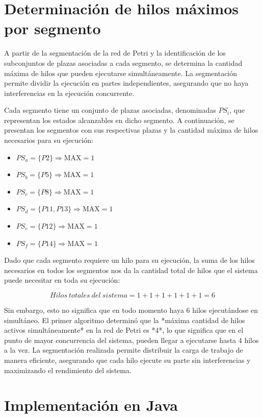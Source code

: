 \documentclass[12pt]{article}
\begin{document}
\section{Determinación de hilos máximos por segmento}

A partir de la segmentación de la red de Petri y la identificación de los subconjuntos de plazas asociadas a cada segmento, se determina la cantidad máxima de hilos que pueden ejecutarse simultáneamente. La segmentación permite dividir la ejecución en partes independientes, asegurando que no haya interferencias en la ejecución concurrente.

Cada segmento tiene un conjunto de plazas asociadas, denominadas \(PS_i\), que representan los estados alcanzables en dicho segmento. A continuación, se presentan los segmentos con sus respectivas plazas y la cantidad máxima de hilos necesarios para su ejecución:

\begin{itemize}
    \item \(PS_a = \{P2\} \Rightarrow \text{MAX} = 1\)
    \item \(PS_b = \{P5\} \Rightarrow \text{MAX} = 1\)
    \item \(PS_c = \{P8\} \Rightarrow \text{MAX} = 1\)
    \item \(PS_d = \{P11, P13\} \Rightarrow \text{MAX} = 1\)
    \item \(PS_e = \{P12\} \Rightarrow \text{MAX} = 1\)
    \item \(PS_f = \{P14\} \Rightarrow \text{MAX} = 1\)
\end{itemize}

Dado que cada segmento requiere un hilo para su ejecución, la suma de los hilos necesarios en todos los segmentos nos da la cantidad total de hilos que el sistema puede necesitar en toda su ejecución:

\[
Hilos\ totales\ del\ sistema = 1 + 1 + 1 + 1 + 1 + 1 = 6
\]

Sin embargo, esto no significa que en todo momento haya 6 hilos ejecutándose en simultáneo.  
El primer algoritmo determinó que la *máxima cantidad de hilos activos simultáneamente* en la red de Petri es *4*, lo que significa que en el punto de mayor concurrencia del sistema, pueden llegar a ejecutarse hasta 4 hilos a la vez.  
La segmentación realizada permite distribuir la carga de trabajo de manera eficiente, asegurando que cada hilo ejecute su parte sin interferencias y maximizando el rendimiento del sistema.

\section{Implementación en Java}
\end{document}
